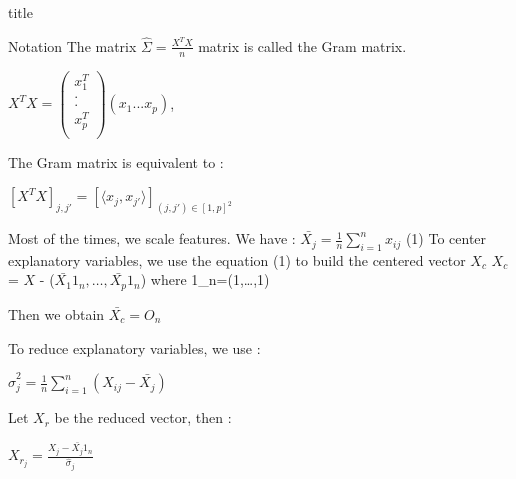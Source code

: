\documentclass[unknownkeysallowed]{beamer}
\begin{document}
\begin{frame}{title}
	
\begin{block}{Notation}
The matrix $\hat\Sigma=\frac{X^TX}{n}$ matrix is called the Gram matrix.
\begin{center}
    $X^TX=\begin{pmatrix}
   x_{1}^T  \\
   . \\
   . \\
   x_{p}^T  \\
\end{pmatrix}(x_{1}. . . x_{p}) $,
\end{center}

\end{block}
The Gram matrix is equivalent to :
\begin{center}
$[X^TX]_{j,j'}=[\langle x_{j},x_{j'}\rangle]_{(j,j')\in[1,p]^2}$
\end{center}

\rem
Most of the times, we scale features.
\newline
We have : $\bar{X_{j}}=\frac{1}{n} \sum\limits_{i=1}^{n} x_{ij}$ (1)
\newline
 To center explanatory variables, we use the equation (1) to build the centered vector $X_{c}$
\newline
$X_{c}$ =  $X$ - ($\bar{X_{1}}1_n,\dots,\bar{X_{p}}1_n$) where 1_n=(1,\dots,1)

Then we obtain $\bar{X_{c}}=O_n$

To reduce explanatory variables, we use :
\newline
\begin{center}
$\hat\sigma_{j}^2=\frac{1}{n} \sum\limits_{i=1}^{n} (X_{ij}-\bar{X_{j}})$
\end{center}
Let $X_r$ be the reduced vector, then :
\newline
\begin{center}
$X_{r_{j}}=\frac{X_{j}-\bar{X_{j}}1_n}{\hat\sigma_{j}}$
\end{center}
\end{frame}
\end{document}

